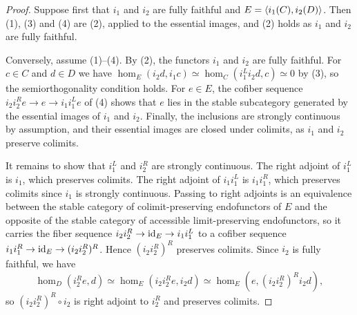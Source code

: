 	\begin{proof}
		Suppose first that $i_1$ and $i_2$ are fully faithful and $E = \langle i_1(C),i_2(D) \rangle$. Then (1), (3) and (4) are (2), applied to the essential images, and (2) holds as $i_1$ and $i_2$ are fully faithful.

		Conversely, assume (1)--(4). By (2), the functors $i_1$ and $i_2$ are fully faithful. For $c \in C$ and $d \in D$ we have $\hom_E(i_2d,i_1c) \simeq \hom_C(i_1^Li_2d,c) \simeq 0$ by (3), so the semiorthogonality condition holds. For $e \in E$, the cofiber sequence $i_2i_2^Re \to e \to i_1i_1^Le$ of (4) shows that $e$ lies in the stable subcategory generated by the essential images of $i_1$ and $i_2$. Finally, the inclusions are strongly continuous by assumption, and their essential images are closed under colimits, as $i_1$ and $i_2$ preserve colimits.

		It remains to show that $i_1^L$ and $i_2^R$ are strongly continuous. The right adjoint of $i_1^L$ is $i_1$, which preserves colimits. The right adjoint of $i_1i_1^L$ is $i_1i_1^R$, which preserves colimits since $i_1$ is strongly continuous. Passing to right adjoints is an equivalence between the stable category of colimit-preserving endofunctors of $E$ and the opposite of the stable category of accessible limit-preserving endofunctors, so it carries the fiber sequence $i_2i_2^R \to \operatorname{id}_E \to i_1i_1^L$ to a cofiber sequence $i_1i_1^R \to \operatorname{id}_E \to (i_2i_2^R)^R$. Hence $(i_2i_2^R)^R$ preserves colimits. Since $i_2$ is fully faithful, we have
		\[
			\hom_D(i_2^Re,d) \simeq \hom_E(i_2i_2^Re,i_2d) \simeq \hom_E(e,(i_2i_2^R)^R i_2 d),
		\]
		so $(i_2i_2^R)^R \circ i_2$ is right adjoint to $i_2^R$ and preserves colimits.
	\end{proof}


